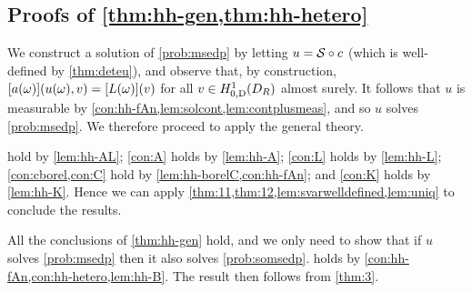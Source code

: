 \subsection{Proofs of \cref{thm:hh-gen,thm:hh-hetero}}\label{sec:applying}

\label{page:thmhhgenproof}
We construct a solution of \cref{prob:msedp} by letting $u = \mathcal S\circ c$ (which is well-defined by \cref{thm:deteu}), and observe that, by construction, $\mleft[a(\omega)\mright]\mleft(u(\omega),v\mright) = \mleft[L(\omega)\mright](v)$ for all $v \in \HozDDR$ almost surely. It follows that $u$ is measurable by \cref{con:hh-fAn,lem:solcont,lem:contplusmeas}, and so $u$ solves \cref{prob:msedp}. We therefore proceed to apply the general theory.

 hold by \cref{lem:hh-AL};
\cref{con:A} holds by \cref{lem:hh-A};
\cref{con:L} holds by \cref{lem:hh-L};
 \cref{con:cborel,con:C} hold by \cref{lem:hh-borelC,con:hh-fAn};
and \cref{con:K} holds by \cref{lem:hh-K}. Hence we can apply \cref{thm:11,thm:12,lem:svarwelldefined,lem:uniq} to conclude the results.
\epf

\label{page:thmhhheteroproof}
All the conclusions of \cref{thm:hh-gen} hold, and we only need to show that if $u$ solves \cref{prob:msedp} then it also solves \cref{prob:somsedp}.  holds by \cref{con:hh-fAn,con:hh-hetero,lem:hh-B}. The result then follows from \cref{thm:3}.
\epf
